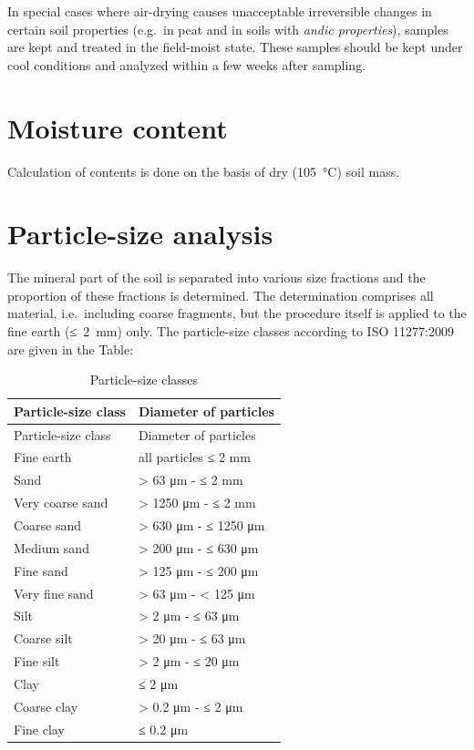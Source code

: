 \documentclass[
  letterpaper,
  DIV=11,
  numbers=noendperiod]{scrreprt}
\begin{document}
In special cases where air-drying causes unacceptable irreversible
changes in certain soil properties (e.g.~in peat and in soils with
\emph{andic properties}), samples are kept and treated in the
field-moist state. These samples should be kept under cool conditions
and analyzed within a few weeks after sampling.

\hypertarget{moisture-content}{%
\section{Moisture content}\label{moisture-content}}

Calculation of contents is done on the basis of dry (105~°C) soil mass.

\hypertarget{particle-size-analysis}{%
\section{Particle-size analysis}\label{particle-size-analysis}}

The mineral part of the soil is separated into various size fractions
and the proportion of these fractions is determined. The determination
comprises all material, i.e.~including coarse fragments, but the
procedure itself is applied to the fine earth (≤~2~mm) only. The
particle-size classes according to ISO 11277:2009 are given in the
Table:

\begin{longtable}[]{@{}ll@{}}
\caption{Particle-size classes}\tabularnewline
\toprule()
Particle-size class & Diameter of particles \\
\midrule()
\endfirsthead
\toprule()
Particle-size class & Diameter of particles \\
\midrule()
\endhead
Fine earth & all particles ≤ 2 mm \\
Sand & \textgreater{} 63 μm - ≤ 2 mm \\
Very coarse sand & \textgreater{} 1250 μm - ≤ 2 mm \\
Coarse sand & \textgreater{} 630 μm - ≤ 1250 μm \\
Medium sand & \textgreater{} 200 μm - ≤ 630 μm \\
Fine sand & \textgreater{} 125 μm - ≤ 200 μm \\
Very fine sand & \textgreater{} 63 μm - \textless{} 125 μm \\
Silt & \textgreater{} 2 μm - ≤ 63 μm \\
Coarse silt & \textgreater{} 20 μm - ≤ 63 μm \\
Fine silt & \textgreater{} 2 μm - ≤ 20 μm \\
Clay & ≤ 2 μm \\
Coarse clay & \textgreater{} 0.2 μm - ≤ 2 μm \\
Fine clay & ≤ 0.2 μm \\
\bottomrule()
\end{longtable}
\end{document}
